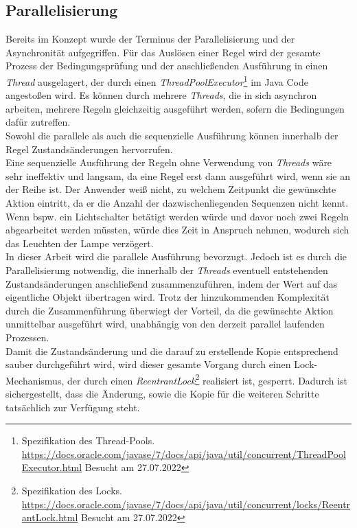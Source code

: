 \subsection{Parallelisierung}
\label{subsec:parallelisierung}
    Bereits im Konzept wurde der Terminus der Parallelisierung und der Asynchronität aufgegriffen. Für das Auslösen einer Regel wird der gesamte Prozess der 
    Bedingungsprüfung und der anschließenden Ausführung in einen \textit{Thread} ausgelagert, der durch einen 
    \textit{ThreadPoolExecutor}\footnote{Spezifikation des Thread-Pools. \url{https://docs.oracle.com/javase/7/docs/api/java/util/concurrent/ThreadPoolExecutor.html} Besucht am 27.07.2022} im Java Code angestoßen wird. 
    Es können durch mehrere \textit{Threads}, die in sich asynchron arbeiten, mehrere Regeln gleichzeitig ausgeführt werden, sofern die Bedingungen dafür zutreffen. 
    \\
    Sowohl die parallele als auch die sequenzielle Ausführung können innerhalb der Regel Zustandsänderungen hervorrufen.
    \\
    Eine sequenzielle Ausführung der Regeln ohne Verwendung von \textit{Threads} wäre sehr ineffektiv und langsam, da eine Regel erst dann ausgeführt wird, wenn sie an der Reihe ist. Der Anwender weiß nicht, zu welchem 
    Zeitpunkt die gewünschte Aktion eintritt, da er die Anzahl der dazwischenliegenden Sequenzen nicht kennt. 
    Wenn bspw. ein Lichtschalter betätigt werden würde und davor noch zwei Regeln abgearbeitet werden müssten, würde dies Zeit in Anspruch nehmen, wodurch sich das Leuchten der Lampe verzögert. 
    \\
    \linebreak 
    In dieser Arbeit wird die parallele Ausführung bevorzugt. Jedoch ist es durch die Parallelisierung 
    notwendig, die innerhalb der \textit{Threads} eventuell entstehenden Zustandsänderungen anschließend 
    zusammenzuführen, indem der Wert auf das eigentliche Objekt übertragen wird. Trotz der hinzukommenden 
    Komplexität durch die Zusammenführung überwiegt der Vorteil, da 
    die gewünschte Aktion unmittelbar ausgeführt wird, unabhängig von den derzeit parallel laufenden Prozessen. 
    \\
    Damit die Zustandsänderung und die darauf zu erstellende Kopie entsprechend sauber durchgeführt wird, wird dieser gesamte Vorgang durch einen 
    Lock-Mechanismus, der durch einen \textit{ReentrantLock}\footnote{Spezifikation des Locks. \url{https://docs.oracle.com/javase/7/docs/api/java/util/concurrent/locks/ReentrantLock.html} Besucht am 27.07.2022} 
    realisiert ist, gesperrt. Dadurch ist sichergestellt, dass die Änderung, sowie die Kopie für die weiteren Schritte tatsächlich zur Verfügung steht. 

